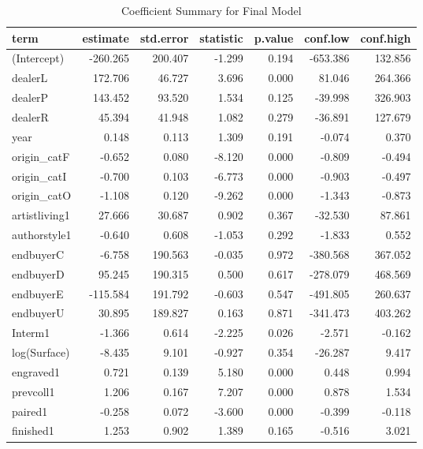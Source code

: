 \documentclass[]{article}
\begin{document}
\begin{table}[!h]

\caption{\label{tab:unnamed-chunk-6}Coefficient Summary for Final Model}
\centering
\begin{tabular}[t]{l|r|r|r|r|r|r}
\hline
term & estimate & std.error & statistic & p.value & conf.low & conf.high\\
\hline
(Intercept) & -260.265 & 200.407 & -1.299 & 0.194 & -653.386 & 132.856\\
\hline
dealerL & 172.706 & 46.727 & 3.696 & 0.000 & 81.046 & 264.366\\
\hline
dealerP & 143.452 & 93.520 & 1.534 & 0.125 & -39.998 & 326.903\\
\hline
dealerR & 45.394 & 41.948 & 1.082 & 0.279 & -36.891 & 127.679\\
\hline
year & 0.148 & 0.113 & 1.309 & 0.191 & -0.074 & 0.370\\
\hline
origin\_catF & -0.652 & 0.080 & -8.120 & 0.000 & -0.809 & -0.494\\
\hline
origin\_catI & -0.700 & 0.103 & -6.773 & 0.000 & -0.903 & -0.497\\
\hline
origin\_catO & -1.108 & 0.120 & -9.262 & 0.000 & -1.343 & -0.873\\
\hline
artistliving1 & 27.666 & 30.687 & 0.902 & 0.367 & -32.530 & 87.861\\
\hline
authorstyle1 & -0.640 & 0.608 & -1.053 & 0.292 & -1.833 & 0.552\\
\hline
endbuyerC & -6.758 & 190.563 & -0.035 & 0.972 & -380.568 & 367.052\\
\hline
endbuyerD & 95.245 & 190.315 & 0.500 & 0.617 & -278.079 & 468.569\\
\hline
endbuyerE & -115.584 & 191.792 & -0.603 & 0.547 & -491.805 & 260.637\\
\hline
endbuyerU & 30.895 & 189.827 & 0.163 & 0.871 & -341.473 & 403.262\\
\hline
Interm1 & -1.366 & 0.614 & -2.225 & 0.026 & -2.571 & -0.162\\
\hline
log(Surface) & -8.435 & 9.101 & -0.927 & 0.354 & -26.287 & 9.417\\
\hline
engraved1 & 0.721 & 0.139 & 5.180 & 0.000 & 0.448 & 0.994\\
\hline
prevcoll1 & 1.206 & 0.167 & 7.207 & 0.000 & 0.878 & 1.534\\
\hline
paired1 & -0.258 & 0.072 & -3.600 & 0.000 & -0.399 & -0.118\\
\hline
finished1 & 1.253 & 0.902 & 1.389 & 0.165 & -0.516 & 3.021\\

\end{tabular}
\end{table}
\end{document}
